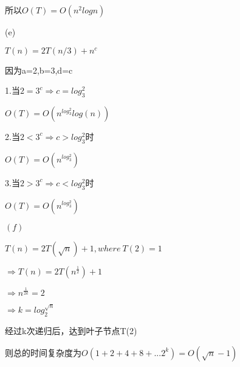 \documentclass[
]{ctexart}
\begin{document}
所以\(O(T)=O(n^2logn)\)

(e)

\(T(n)=2T(n/3)+n^{c}\)

因为a=2,b=3,d=c

1.当\(2=3^c\Rightarrow c=log_3^2\)

\(O(T)=O(n^{log_3^2}log(n))\)

2.当\(2<3^c\Rightarrow c>log_3^2\)时

\(O(T)=O(n^{log_3^2})\)

3.当\(2 > 3^c\Rightarrow c<log_3^2\)时

\(O(T)=O(n^{log_3^2})\)

\((f)\)

\(T(n)=2T(\sqrt{n})+1,where\ T(2)=1\)

\(\Rightarrow T(n)=2T(n^{\frac{1}{2}})+1\)

\(\Rightarrow n^{\frac{1}{2k}}=2\)

\(\Rightarrow k=log_{2}^{\sqrt{n}}\)

经过k次递归后，达到叶子节点T(2)

则总的时间复杂度为\(O(1+2+4+8+...2^{k})=O(\sqrt{n}-1)\)
\end{document}
